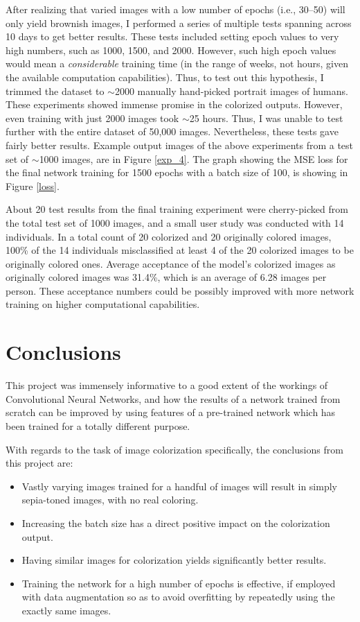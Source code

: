 \documentclass[10pt,twocolumn,letterpaper]{article}
\begin{document}
	After realizing that varied images with a low number of epochs (i.e., 30--50) will only yield brownish images, I performed a series of multiple tests spanning across 10 days to get better results. These tests included setting epoch values to very high numbers, such as 1000, 1500, and 2000. However, such high epoch values would mean a \textit{considerable} training time (in the range of weeks, not hours, given the available computation capabilities). Thus, to test out this hypothesis, I trimmed the dataset to $\sim$2000 manually hand-picked portrait images of humans. These experiments showed immense promise in the colorized outputs. However, even training with just 2000 images took $\sim$25 hours. Thus, I was unable to test further with the entire dataset of 50,000 images. Nevertheless, these tests gave fairly better results. Example output images of the above experiments from a test set of $\sim$1000 images, are in Figure \ref{exp_4}. The graph showing the MSE loss for the final network training for 1500 epochs with a batch size of 100, is showing in Figure \ref{loss}.

	About 20 test results from the final training experiment were cherry-picked from the total test set of 1000 images, and a small user study was conducted with 14 individuals. In a total count of 20 colorized and 20 originally colored images, 100\% of the 14 individuals misclassified at least 4 of the 20 colorized images to be originally colored ones. Average acceptance of the model's colorized images as originally colored images was 31.4\%, which is an average of 6.28 images per person. These acceptance numbers could be possibly improved with more network training on higher computational capabilities.

	\section{Conclusions}
	This project was immensely informative to a good extent of the workings of Convolutional Neural Networks, and how the results of a network trained from scratch can be improved by using features of a pre-trained network which has been trained for a totally different purpose.

	With regards to the task of image colorization specifically, the conclusions from this project are:
	\begin{itemize}
		\item Vastly varying images trained for a handful of images will result in simply sepia-toned images, with no real coloring.
		\item Increasing the batch size has a direct positive impact on the colorization output.
		\item Having similar images for colorization yields significantly better results.
		\item Training the network for a high number of epochs is effective, if employed with data augmentation so as to avoid overfitting by repeatedly using the exactly same images.
	\end{itemize}
\end{document}
